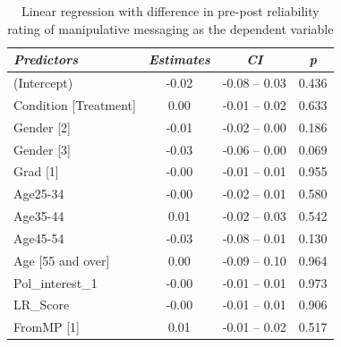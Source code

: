\documentclass[empirical, authordate, issue]{jote-new-article}
\begin{document}
\begin{table}

  \caption{Linear regression with difference in pre-post reliability rating of manipulative messaging as the dependent variable }
  \label{tab:tableS33}


  \begin{tabularx}{\linewidth}{@{} X  S  S  S@{}}

    \toprule
    \emph{Predictors}                                    & {\emph{Estimates}}                        & {\emph{\emph{CI}}} & {\emph{p}} \\
    \midrule
    (Intercept)                                          & -0.02                                     & -0.08 -- 0.03      & 0.436      \\
    Condition [Treatment]                                & 0.00                                      & -0.01 -- 0.02      & 0.633      \\
    Gender [2]                                           & -0.01                                     & -0.02 -- 0.00      & 0.186      \\
    Gender [3]                                           & -0.03                                     & -0.06 -- 0.00      & 0.069      \\
    Grad [1]                                             & -0.00                                     & -0.01 -- 0.01      & 0.955      \\
    Age25-34                                             & -0.00                                     & -0.02 -- 0.01      & 0.580      \\
    Age35-44                                             & 0.01                                      & -0.02 -- 0.03      & 0.542      \\
    Age45-54                                             & -0.03                                     & -0.08 -- 0.01      & 0.130      \\
    Age [55 and over]                                    & 0.00                                      & -0.09 -- 0.10      & 0.964      \\
    Pol\_interest\_1                                     & -0.00                                     & -0.01 -- 0.01      & 0.973      \\
    LR\_Score                                            & -0.00                                     & -0.01 -- 0.01      & 0.906      \\
    FromMP [1]                                           & 0.01                                      & -0.01 -- 0.02      & 0.517      \\

\end{tabularx}
\end{table}
\end{document}
